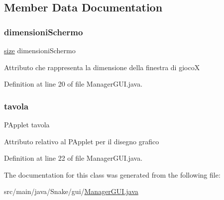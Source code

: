 \subsection{Member Data Documentation}
\mbox{\label{class_snake_1_1gui_1_1_manager_g_u_i_afb06bc6415a42c22b3a6d0d140a4885f}} 
\subsubsection{\texorpdfstring{dimensioni\+Schermo}{dimensioniSchermo}}
{\footnotesize\ttfamily \mbox{\hyperlink{class_snake_1_1gui_1_1size}{size}} dimensioni\+Schermo\hspace{0.3cm}{\ttfamily [private]}}

Attributo che rappresenta la dimensione della finestra di giocoX 

Definition at line 20 of file Manager\+G\+U\+I.\+java.

\mbox{\label{class_snake_1_1gui_1_1_manager_g_u_i_a75f316b1f7fa183ba86929af39a01720}} 
\subsubsection{\texorpdfstring{tavola}{tavola}}
{\footnotesize\ttfamily P\+Applet tavola\hspace{0.3cm}{\ttfamily [private]}}

Attributo relativo al P\+Applet per il disegno grafico 

Definition at line 22 of file Manager\+G\+U\+I.\+java.



The documentation for this class was generated from the following file\+:\begin{DoxyCompactItemize}
\item 
src/main/java/\+Snake/gui/\mbox{\hyperlink{_manager_g_u_i_8java}{Manager\+G\+U\+I.\+java}}\end{DoxyCompactItemize}
